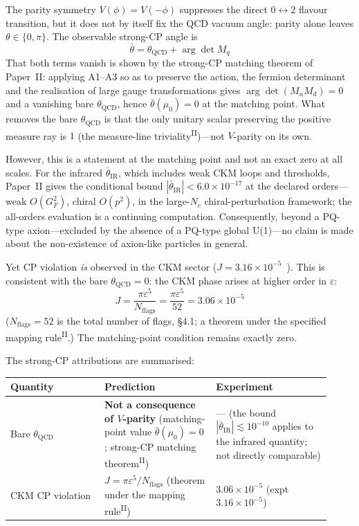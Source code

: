\documentclass[12pt,a4paper]{article}
\newcommand{\PII}{\textsuperscript{\textup{II}}}
\begin{document}
The parity symmetry $V(\phi) = V(-\phi)$ suppresses the direct
$0\leftrightarrow2$ flavour transition, but it does not by itself fix
the QCD vacuum angle: parity alone leaves $\theta\in\{0,\pi\}$.
The observable strong-CP angle is
\[\bar\theta = \theta_\mathrm{QCD} + \arg\det M_q\]
That both terms vanish is shown by the strong-CP matching theorem of Paper~II: applying A1--A3 so as to preserve the action, the fermion determinant and the realisation of large gauge transformations gives $\arg\det(M_uM_d) = 0$ and a vanishing bare $\theta_\mathrm{QCD}$, hence $\bar\theta(\mu_0) = 0$ at the matching point. What removes the bare $\theta_\mathrm{QCD}$ is that the only unitary scalar preserving the positive measure ray is $1$ (the measure-line triviality\PII{})---not $V$-parity on its own.

However, this is a statement at the matching point and not an exact zero at all scales. For the infrared $\bar\theta_\mathrm{IR}$, which includes weak CKM loops and thresholds, Paper~II gives the conditional bound $|\bar\theta_\mathrm{IR}| < 6.0\times10^{-17}$ at the declared orders---weak $O(G_F^2)$, chiral $O(p^2)$, in the large-$N_c$ chiral-perturbation framework; the all-orders evaluation is a continuing computation. Consequently, beyond a PQ-type axion---excluded by the absence of a PQ-type global U(1)---no claim is made about the non-existence of axion-like particles in general.

Yet CP violation \emph{is} observed in the CKM sector ($J = 3.16 \times 10^{-5}$~\cite{pdg}). This is consistent with the bare $\theta_\mathrm{QCD} = 0$: the CKM phase arises at higher order in $\varepsilon$:
\[J = \frac{\pi\varepsilon^5}{N_\mathrm{flags}} = \frac{\pi\varepsilon^5}{52} = 3.06\times10^{-5}\]
($N_\mathrm{flags} = 52$ is the total number of flags, \S4.1; a theorem under the specified mapping rule\PII{}.) The matching-point condition remains exactly zero.

The strong-CP attributions are summarised:
\medskip
\begin{center}\footnotesize
\begin{tabular}{@{}p{0.27\linewidth}p{0.32\linewidth}p{0.33\linewidth}@{}}
\toprule
Quantity & Prediction & Experiment \\
\midrule
Bare $\theta_\mathrm{QCD}$ & \textbf{Not a consequence of $V$-parity} (matching-point value $\bar\theta(\mu_0)=0$; strong-CP matching theorem\PII{}) & --- (the bound $|\bar\theta_\mathrm{IR}| \lesssim 10^{-10}$ applies to the infrared quantity; not directly comparable) \\
CKM CP violation & $J = \pi\varepsilon^5/N_\mathrm{flags}$ (theorem under the mapping rule\PII{}) & $3.06 \times 10^{-5}$ (expt $3.16{\times}10^{-5}$) \\
\bottomrule
\end{tabular}
\end{center}
\bigskip
\end{document}
